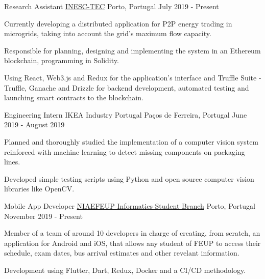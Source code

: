 
\begin{cventries}
  \cventry
    {Research Assistant} %
    {\href{https://www.inesctec.pt/en}{INESC-TEC}} %
    {Porto, Portugal} %
    {July 2019 - Present} %
    {
      \begin{cvitems} %
        \item {Currently developing a distributed application for P2P energy trading in microgrids, taking into account the grid's maximum flow capacity.}
        \item {Responsible for planning, designing and implementing the system in an Ethereum blockchain, programming in Solidity.}
        \item {Using React, Web3.js and Redux for the application's interface and Truffle Suite - Truffle, Ganache and Drizzle for backend development, automated testing and launching smart contracts to the blockchain.}
      \end{cvitems}
    }

  \cventry
    {Engineering Intern} %
    {IKEA Industry Portugal} %
    {Paços de Ferreira, Portugal} %
    {June 2019 - August 2019} %
    {
      \begin{cvitems} %
        \item {Planned and thoroughly studied the implementation of a computer vision system reinforced with machine learning to detect missing components on packaging lines.}
        \item {Developed simple testing scripts using Python and open source computer vision libraries like OpenCV.}
      \end{cvitems}
    }

  \cventry
    {Mobile App Developer} %
    {\href{https://ni.fe.up.pt}{NIAEFEUP Informatics Student Branch}} %
    {Porto, Portugal} %
    {November 2019 - Present} %
    {
      \begin{cvitems} %
        \item {Member of a team of around 10 developers in charge of creating, from scratch, an application for Android and iOS, that allows any student of FEUP to access their schedule, exam dates, bus arrival estimates and other revelant information.}
        \item{Development using Flutter, Dart, Redux, Docker and a CI/CD methodology.}
      \end{cvitems}
    }
   
\end{cventries}
